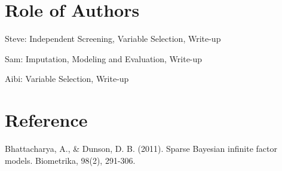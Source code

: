 \documentclass[a4paper]{article}
\begin{document}
\section*{Role of Authors}

Steve: Independent Screening, Variable Selection, Write-up

Sam: Imputation, Modeling and Evaluation, Write-up

Aibi: Variable Selection, Write-up

\section*{Reference}
Bhattacharya, A., \& Dunson, D. B. (2011). Sparse Bayesian infinite factor models. Biometrika, 98(2), 291-306.
\end{document}
